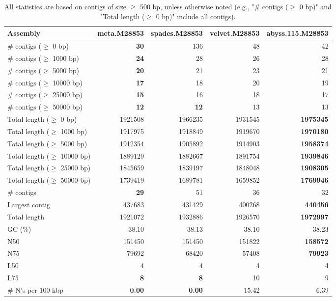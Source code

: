 \documentclass[12pt,a4paper]{article}
\begin{document}
\begin{table}[ht]
\begin{center}
\caption{All statistics are based on contigs of size $\geq$ 500 bp, unless otherwise noted (e.g., "\# contigs ($\geq$ 0 bp)" and "Total length ($\geq$ 0 bp)" include all contigs).}
\begin{tabular}{|l*{4}{|r}|}
\hline
Assembly & meta.M28853 & spades.M28853 & velvet.M28853 & abyss.115.M28853 \\ \hline
\# contigs ($\geq$ 0 bp) & {\bf 30} & 136 & 48 & 42 \\ \hline
\# contigs ($\geq$ 1000 bp) & {\bf 24} & 28 & 26 & 28 \\ \hline
\# contigs ($\geq$ 5000 bp) & {\bf 20} & 21 & 23 & 21 \\ \hline
\# contigs ($\geq$ 10000 bp) & {\bf 17} & 18 & 20 & 19 \\ \hline
\# contigs ($\geq$ 25000 bp) & {\bf 15} & 16 & 18 & 17 \\ \hline
\# contigs ($\geq$ 50000 bp) & {\bf 12} & {\bf 12} & 13 & 13 \\ \hline
Total length ($\geq$ 0 bp) & 1921508 & 1966235 & 1931545 & {\bf 1975345} \\ \hline
Total length ($\geq$ 1000 bp) & 1917975 & 1918849 & 1919670 & {\bf 1970180} \\ \hline
Total length ($\geq$ 5000 bp) & 1912354 & 1905892 & 1914903 & {\bf 1958374} \\ \hline
Total length ($\geq$ 10000 bp) & 1889129 & 1882667 & 1891754 & {\bf 1939846} \\ \hline
Total length ($\geq$ 25000 bp) & 1845659 & 1839197 & 1848048 & {\bf 1908305} \\ \hline
Total length ($\geq$ 50000 bp) & 1739419 & 1689781 & 1659852 & {\bf 1769946} \\ \hline
\# contigs & {\bf 29} & 51 & 36 & 32 \\ \hline
Largest contig & 437683 & 431429 & 400268 & {\bf 440456} \\ \hline
Total length & 1921072 & 1932886 & 1926570 & {\bf 1972997} \\ \hline
GC (\%) & 38.10 & 38.13 & 38.10 & 38.23 \\ \hline
N50 & 151450 & 151450 & 151822 & {\bf 158572} \\ \hline
N75 & 79692 & 68420 & 57408 & {\bf 79923} \\ \hline
L50 & 4 & 4 & 4 & 4 \\ \hline
L75 & {\bf 8} & {\bf 8} & 10 & 9 \\ \hline
\# N's per 100 kbp & {\bf 0.00} & {\bf 0.00} & 15.42 & 6.39 \\ \hline
\end{tabular}
\end{center}
\end{table}
\end{document}
